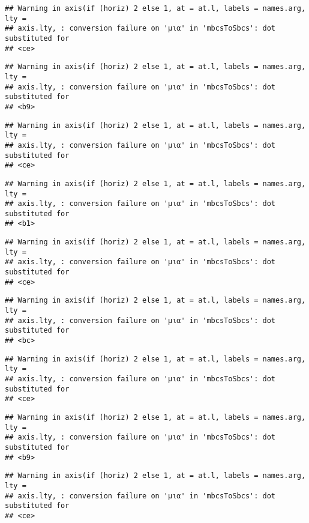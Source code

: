 \documentclass[
]{article}
\begin{document}
\begin{verbatim}
## Warning in axis(if (horiz) 2 else 1, at = at.l, labels = names.arg, lty =
## axis.lty, : conversion failure on 'μια' in 'mbcsToSbcs': dot substituted for
## <ce>
\end{verbatim}

\begin{verbatim}
## Warning in axis(if (horiz) 2 else 1, at = at.l, labels = names.arg, lty =
## axis.lty, : conversion failure on 'μια' in 'mbcsToSbcs': dot substituted for
## <b9>
\end{verbatim}

\begin{verbatim}
## Warning in axis(if (horiz) 2 else 1, at = at.l, labels = names.arg, lty =
## axis.lty, : conversion failure on 'μια' in 'mbcsToSbcs': dot substituted for
## <ce>
\end{verbatim}

\begin{verbatim}
## Warning in axis(if (horiz) 2 else 1, at = at.l, labels = names.arg, lty =
## axis.lty, : conversion failure on 'μια' in 'mbcsToSbcs': dot substituted for
## <b1>
\end{verbatim}

\begin{verbatim}
## Warning in axis(if (horiz) 2 else 1, at = at.l, labels = names.arg, lty =
## axis.lty, : conversion failure on 'μια' in 'mbcsToSbcs': dot substituted for
## <ce>
\end{verbatim}

\begin{verbatim}
## Warning in axis(if (horiz) 2 else 1, at = at.l, labels = names.arg, lty =
## axis.lty, : conversion failure on 'μια' in 'mbcsToSbcs': dot substituted for
## <bc>
\end{verbatim}

\begin{verbatim}
## Warning in axis(if (horiz) 2 else 1, at = at.l, labels = names.arg, lty =
## axis.lty, : conversion failure on 'μια' in 'mbcsToSbcs': dot substituted for
## <ce>
\end{verbatim}

\begin{verbatim}
## Warning in axis(if (horiz) 2 else 1, at = at.l, labels = names.arg, lty =
## axis.lty, : conversion failure on 'μια' in 'mbcsToSbcs': dot substituted for
## <b9>
\end{verbatim}

\begin{verbatim}
## Warning in axis(if (horiz) 2 else 1, at = at.l, labels = names.arg, lty =
## axis.lty, : conversion failure on 'μια' in 'mbcsToSbcs': dot substituted for
## <ce>
\end{verbatim}
\end{document}
